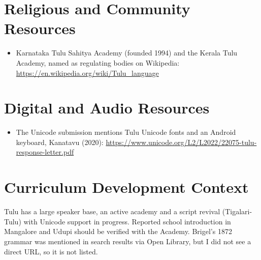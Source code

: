 \documentclass[12pt]{article}
\begin{document}
\section{Religious and Community Resources}
\begin{itemize}
\item Karnataka Tulu Sahitya Academy (founded 1994) and the Kerala Tulu Academy, named as regulating bodies on Wikipedia: \url{https://en.wikipedia.org/wiki/Tulu_language}
\end{itemize}

\section{Digital and Audio Resources}
\begin{itemize}
\item The Unicode submission mentions Tulu Unicode fonts and an Android keyboard, Kanatavu (2020): \url{https://www.unicode.org/L2/L2022/22075-tulu-response-letter.pdf}
\end{itemize}

\section{Curriculum Development Context}
Tulu has a large speaker base, an active academy and a script revival (Tigalari-Tulu) with Unicode support in progress. Reported school introduction in Mangalore and Udupi should be verified with the Academy. Brigel's 1872 grammar was mentioned in search results via Open Library, but I did not see a direct URL, so it is not listed.
\end{document}
